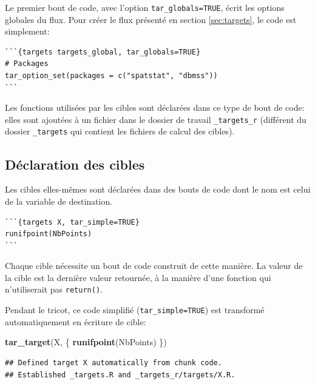 \documentclass[
  12pt,
  french,
  a4paper,
  extrafontsizes,onecolumn,openright
  ]{memoir}
\newenvironment{Shaded}{\begin{snugshade}}{\end{snugshade}}
\newcommand{\KeywordTok}[1]{\textcolor[rgb]{0.13,0.29,0.53}{\textbf{#1}}}
\newcommand{\NormalTok}[1]{#1}
\begin{document}
\normalsize

Le premier bout de code, avec l'option \texttt{tar\_globals=TRUE}, écrit les options globales du flux.
Pour créer le flux présenté en section \ref{sec:targets}, le code est simplement:

\begin{verbatim}
```{targets targets_global, tar_globals=TRUE}
# Packages
tar_option_set(packages = c("spatstat", "dbmss"))
```
\end{verbatim}

Les fonctions utilisées par les cibles sont déclarées dans ce type de bout de code: elles sont ajoutées à un fichier dans le dossier de travail \texttt{\_targets\_r} (différent du dossier \texttt{\_targets} qui contient les fichiers de calcul des cibles).

\hypertarget{duxe9claration-des-cibles}{%
\subsection{Déclaration des cibles}\label{duxe9claration-des-cibles}}

Les cibles elles-mêmes sont déclarées dans des bouts de code dont le nom est celui de la variable de destination.

\begin{verbatim}
```{targets X, tar_simple=TRUE}
runifpoint(NbPoints)
```
\end{verbatim}

Chaque cible nécessite un bout de code construit de cette manière.
La valeur de la cible est la dernière valeur retournée, à la manière d'une fonction qui n'utiliserait pas \texttt{return()}.

Pendant le tricot, ce code simplifié (\texttt{tar\_simple=TRUE}) est transformé automatiquement en écriture de cible:

\scriptsize

\begin{Shaded}
\begin{Highlighting}[]
\KeywordTok{tar_target}\NormalTok{(X, \{}
  \KeywordTok{runifpoint}\NormalTok{(NbPoints)}
\NormalTok{\})}
\end{Highlighting}
\end{Shaded}

\begin{verbatim}
## Defined target X automatically from chunk code.
## Established _targets.R and _targets_r/targets/X.R.
\end{verbatim}

\normalsize
\end{document}
